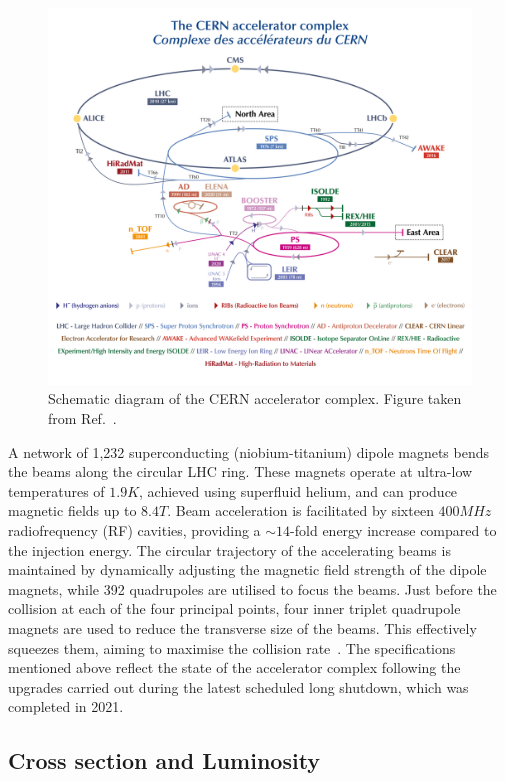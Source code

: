 \begin{figure}[h]
\centering
\includegraphics[width= 1.0\textwidth]{Figures/Chapter3/LHC_AcceleratorComplex.png}
\caption{Schematic diagram of the CERN accelerator complex. Figure taken from Ref.~\cite{LHC_InjectorComplex}.}
\label{Figure:Chapter3_LHC_Complex}
\end{figure}

A network of 1,232 superconducting (niobium-titanium) dipole magnets bends the beams along the circular LHC ring. These magnets operate at ultra-low temperatures of $1.9\unit{K}$, achieved using superfluid helium, and can produce magnetic fields up to $8.4\unit{T}$. Beam acceleration is facilitated by sixteen $400\unit{MHz}$ radiofrequency (RF) cavities, providing a $\sim\!14$-fold energy increase compared to the injection energy. The circular trajectory of the accelerating beams is maintained by dynamically adjusting the magnetic field strength of the dipole magnets, while 392 quadrupoles are utilised to focus the beams. Just before the collision at each of the four principal points, four inner triplet quadrupole magnets are used to reduce the transverse size of the beams. This effectively squeezes them, aiming to maximise the collision rate~\cite{LHC_Run3}. The specifications mentioned above reflect the state of the accelerator complex following the upgrades carried out during the latest scheduled long shutdown, which was completed in 2021.

\subsection{Cross section and Luminosity}

